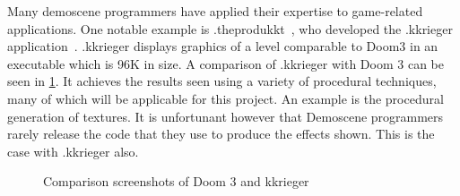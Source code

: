 Many demoscene programmers have applied their expertise to game-related applications.
One notable example is .theprodukkt~\cite{web:theprodukkt}, who developed the .kkrieger application~\cite{web:kkrieger}.
.kkrieger displays graphics of a level comparable to Doom3 in an executable which is 96K in size.
A comparison of .kkrieger with Doom 3 can be seen in \ref{fig:kkriegerdoomcomp}.
It achieves the results seen using a variety of procedural techniques, many of which will be applicable for this project.
An example is the procedural generation of textures.
It is unfortunant however that Demoscene programmers rarely release the code that they use to produce the effects shown.
This is the case with .kkrieger also.

\begin{figure}
  \centering
  \caption{Comparison screenshots of Doom 3 and kkrieger}
  \label{fig:kkriegerdoomcomp}
\end{figure}

